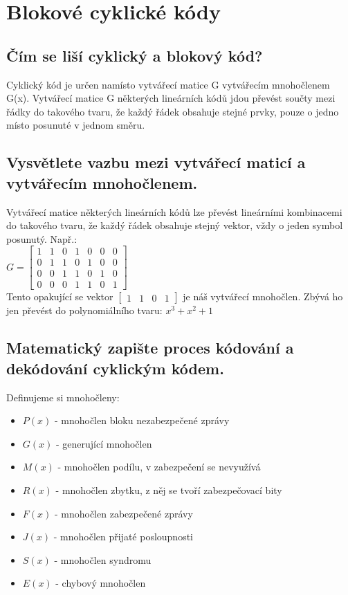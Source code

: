 \clearpage
\section{Blokové cyklické kódy}
\subsection{Čím se liší cyklický a blokový kód?}
Cyklický kód je určen namísto vytvářecí matice G vytvářecím mnohočlenem G(x).
Vytvářecí matice G některých lineárních kódů jdou převést součty mezi řádky do takového tvaru, že každý řádek obsahuje stejné prvky, pouze o jedno místo posunuté v jednom směru.

\subsection{Vysvětlete vazbu mezi vytvářecí maticí a vytvářecím mnohočlenem.}
Vytvářecí matice některých lineárních kódů lze převést lineárními kombinacemi
do takového tvaru, že každý řádek obsahuje stejný vektor, vždy o jeden symbol posunutý. 
Např.:\\ $G=\left[\begin{array}{ccccccc}
    1 & 1 & 0 & 1 & 0 & 0 & 0 \\
    0 & 1 & 1 & 0 & 1 & 0 & 0 \\
    0 & 0 & 1 & 1 & 0 & 1 & 0 \\
    0 & 0 & 0 & 1 & 1 & 0 & 1 
\end{array}
\right]$\\
Tento opakující se vektor $\left[\begin{array}{cccc} 1 & 1 & 0 & 1 \end{array}\right]$ je náš vytvářecí mnohočlen. Zbývá ho jen převést do polynomiálního tvaru:
$x^3+x^2+1$

\subsection{Matematický zapište proces kódování a dekódování cyklickým kódem.}
Definujeme si mnohočleny:
\begin{itemize}
    \item $P(x)$ - mnohočlen bloku nezabezpečené zprávy
    \item $G(x)$ - generující mnohočlen
    \item $M(x)$ - mnohočlen podílu, v zabezpečení se nevyužívá
    \item $R(x)$ - mnohočlen zbytku, z něj se tvoří zabezpečovací bity
    \item $F(x)$ - mnohočlen zabezpečené zprávy
    \item $J(x)$ - mnohočlen přijaté posloupnosti
    \item $S(x)$ - mnohočlen syndromu
    \item $E(x)$ - chybový mnohočlen
\end{itemize}
